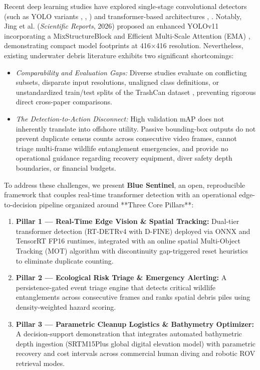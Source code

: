 \documentclass[conference]{IEEEtran}
\begin{document}
Recent deep learning studies have explored single-stage convolutional detectors (such as YOLO variants \cite{yolov3}, \cite{yolo11_base}, \cite{yolotrashcan}) and transformer-based architectures \cite{utnet}, \cite{zhao2025}. Notably, Jing et al. (\textit{Scientific Reports}, 2026) \cite{yolo11_base} proposed an enhanced YOLOv11 incorporating a MixStructureBlock and Efficient Multi-Scale Attention (EMA) \cite{ema}, demonstrating compact model footprints at 416$\times$416 resolution. Nevertheless, existing underwater debris literature exhibits two significant shortcomings:
\begin{itemize}
    \item \emph{Comparability and Evaluation Gaps:} Diverse studies evaluate on conflicting subsets, disparate input resolutions, unaligned class definitions, or unstandardized train/test splits of the TrashCan dataset \cite{trashcan}, preventing rigorous direct cross-paper comparisons.
    \item \emph{The Detection-to-Action Disconnect:} High validation mAP does not inherently translate into offshore utility. Passive bounding-box outputs do not prevent duplicate census counts across consecutive video frames, cannot triage multi-frame wildlife entanglement emergencies, and provide no operational guidance regarding recovery equipment, diver safety depth boundaries, or financial budgets.
\end{itemize}

To address these challenges, we present \textbf{Blue Sentinel}, an open, reproducible framework that couples real-time transformer detection with an operational edge-to-decision pipeline organized around **Three Core Pillars**:
\begin{enumerate}
    \item \textbf{Pillar 1 --- Real-Time Edge Vision \& Spatial Tracking:} Dual-tier transformer detection (RT-DETRv4 with D-FINE) deployed via ONNX and TensorRT FP16 runtimes, integrated with an online spatial Multi-Object Tracking (MOT) algorithm with discontinuity gap-triggered reset heuristics to eliminate duplicate counting.
    \item \textbf{Pillar 2 --- Ecological Risk Triage \& Emergency Alerting:} A persistence-gated event triage engine that detects critical wildlife entanglements across consecutive frames and ranks spatial debris piles using density-weighted hazard scoring.
    \item \textbf{Pillar 3 --- Parametric Cleanup Logistics \& Bathymetry Optimizer:} A decision-support demonstration that integrates automated bathymetric depth ingestion (SRTM15Plus global digital elevation model) with parametric recovery and cost intervals across commercial human diving and robotic ROV retrieval modes.
\end{enumerate}
\end{document}
